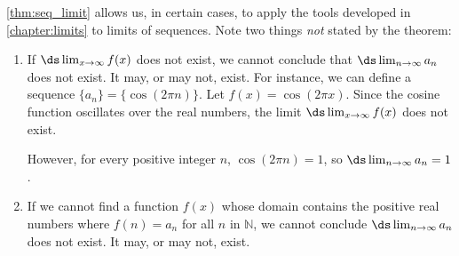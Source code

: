 \autoref{thm:seq_limit} allows us, in certain cases, to apply the tools developed in \autoref{chapter:limits} to limits of sequences. Note two things \textit{not} stated by the theorem:
	\begin{enumerate}
		\item If $\ds \lim_{x\to\infty}f(x)$ does not exist, we cannot conclude that $\ds\lim_{n\to\infty} a_n$ does not exist. It may, or may not, exist. For instance, we can define a sequence $\{a_n\} = \{\cos(2\pi n)\}$. Let $f(x) = \cos (2\pi x)$. Since the cosine function oscillates over the real numbers, the limit $\ds \lim_{x\to\infty}f(x)$ does not exist. 
		
		However, for every positive integer $n$, $\cos(2\pi n) = 1$, so $\ds \lim_{n\to\infty} a_n = 1$.
		
		\item	If we cannot find a function $f(x)$ whose domain contains the positive real numbers where $f(n) = a_n$ for all $n$ in $\mathbb{N}$, we cannot conclude $\ds\lim_{n\to\infty} a_n$ does not exist. It may, or may not, exist.
	\end{enumerate}




